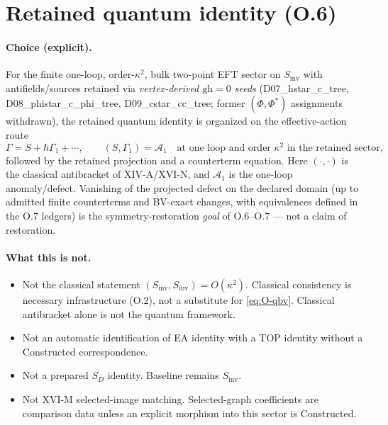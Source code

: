 \section{Retained quantum identity (O.6)}
\label{sec:O-qid}

\paragraph{Choice (explicit).}
For the finite one-loop, order-$\kappa^2$, bulk two-point EFT sector on $S_{\mathrm{inv}}$
with antifields/sources retained via \emph{vertex-derived $\mathrm{gh}=0$ seeds}
(D07\_hstar\_c\_tree, D08\_phistar\_c\_phi\_tree, D09\_cstar\_cc\_tree; former
$({\Phi},{\Phi}^*)$ assignments withdrawn), the retained quantum identity is organized on
the effective-action route
\begin{equation}
\label{eq:O-qbv}
\boxed{
\Gamma=S+\hbar\Gamma_1+\cdots,\qquad
(S,\Gamma_1)=\mathcal A_1
\quad\text{at one loop and order $\kappa^2$ in the retained sector,}
}
\end{equation}
followed by the retained projection and a counterterm equation. Here $(\cdot,\cdot)$ is the
classical antibracket of XIV-A/XVI-N, and $\mathcal A_1$ is the one-loop anomaly/defect.
Vanishing of the projected defect on the declared domain (up to admitted finite counterterms
and BV-exact changes, with equivalences defined in the O.7 ledgers) is the
symmetry-restoration \emph{goal} of O.6--O.7 --- not a claim of restoration.

\paragraph{What this is not.}
\begin{itemize}
\item Not the classical statement $(S_{\mathrm{inv}},S_{\mathrm{inv}})=O(\kappa^2)$.
Classical consistency is necessary infrastructure (O.2), not a substitute for
\eqref{eq:O-qbv}. Classical antibracket alone is not the quantum framework.
\item Not an automatic identification of EA identity with a TOP identity without a Constructed
correspondence.
\item Not a prepared $S_D$ identity. Baseline remains $S_{\mathrm{inv}}$.
\item Not XVI-M selected-image matching. Selected-graph coefficients are comparison data
unless an explicit morphism into this sector is Constructed.
\end{itemize}

